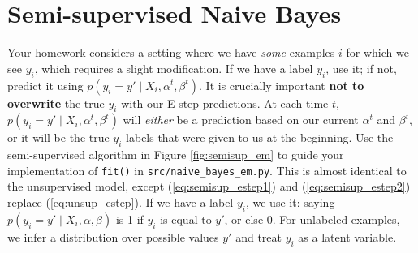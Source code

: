 \documentclass[12pt]{article}
\begin{document}
\section{Semi-supervised Naive Bayes}

Your homework considers a setting where we have \emph{some} examples
$i$ for which we see $y_i$, which requires a slight modification. If we have
a label $y_i$, use it; if not, predict it using $p(y_i = y' \mid X_i, \alpha^t, \beta^t)$.
It is crucially important {\bf not to overwrite} the true $y_i$ with our
E-step predictions. At each time $t$, $p(y_i = y' \mid X_i, \alpha^t, \beta^t)$
will {\it either} be a prediction based on our current $\alpha^t$ and
$\beta^t$, {\it} or it will be the true $y_i$ labels that were given to us at
the beginning.
Use the semi-supervised algorithm in Figure \ref{fig:semisup_em} to guide your
implementation of {\tt fit()} in {\tt src/naive\_bayes\_em.py}.
This is almost identical to the unsupervised model, except
(\ref{eq:semisup_estep1}) and (\ref{eq:semisup_estep2}) replace
(\ref{eq:unsup_estep}).
If we have a label $y_i$, we use it:
saying $p(y_i = y' \mid X_i, \alpha, \beta)$ is 1 if $y_i$ is equal to
$y'$, or else 0. For unlabeled examples, we infer a
distribution over possible values $y'$ and treat $y_i$ as a latent variable.
\end{document}
